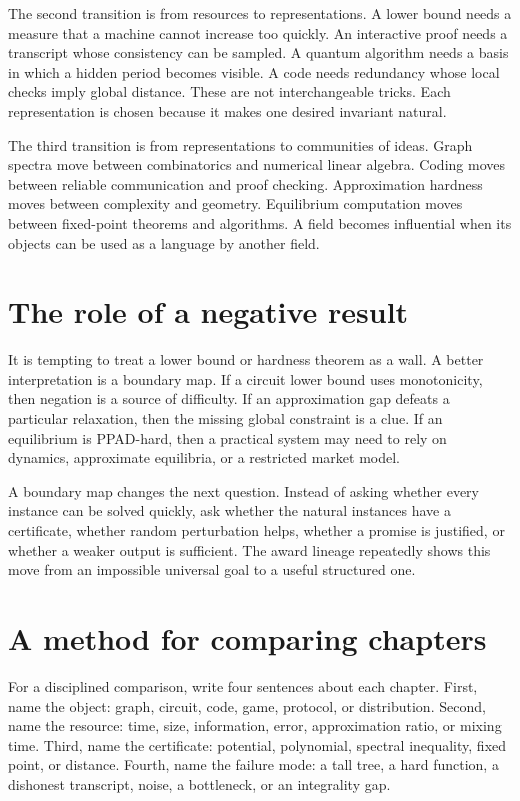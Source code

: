 The second transition is from resources to representations. A lower bound needs a measure that a machine cannot increase too quickly. An interactive proof needs a transcript whose consistency can be sampled. A quantum algorithm needs a basis in which a hidden period becomes visible. A code needs redundancy whose local checks imply global distance. These are not interchangeable tricks. Each representation is chosen because it makes one desired invariant natural.

The third transition is from representations to communities of ideas. Graph spectra move between combinatorics and numerical linear algebra. Coding moves between reliable communication and proof checking. Approximation hardness moves between complexity and geometry. Equilibrium computation moves between fixed-point theorems and algorithms. A field becomes influential when its objects can be used as a language by another field.

\section{The role of a negative result}
It is tempting to treat a lower bound or hardness theorem as a wall. A better interpretation is a boundary map. If a circuit lower bound uses monotonicity, then negation is a source of difficulty. If an approximation gap defeats a particular relaxation, then the missing global constraint is a clue. If an equilibrium is PPAD-hard, then a practical system may need to rely on dynamics, approximate equilibria, or a restricted market model.

A boundary map changes the next question. Instead of asking whether every instance can be solved quickly, ask whether the natural instances have a certificate, whether random perturbation helps, whether a promise is justified, or whether a weaker output is sufficient. The award lineage repeatedly shows this move from an impossible universal goal to a useful structured one.

\section{A method for comparing chapters}
For a disciplined comparison, write four sentences about each chapter. First, name the object: graph, circuit, code, game, protocol, or distribution. Second, name the resource: time, size, information, error, approximation ratio, or mixing time. Third, name the certificate: potential, polynomial, spectral inequality, fixed point, or distance. Fourth, name the failure mode: a tall tree, a hard function, a dishonest transcript, noise, a bottleneck, or an integrality gap.

